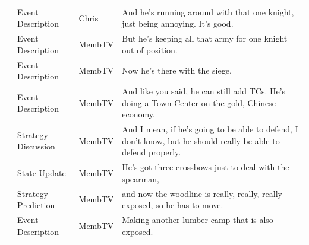 {\begin{longtable}{@{}>{\theAppRow}r|L{2.3cm}L{1.0cm}U{11.55cm}@{}}
    & Event Description     & Chris        & And he's running around with that one knight, just being annoying. It's good.                                                                                                                                                                                    \\
    & Event Description     & MembTV       & But he's keeping all that army for one knight out of position.                                                                                                                                                                                                   \\
    & Event Description     & MembTV       & Now he's there with the siege.                                                                                                                                                                                                                                   \\
    & Event Description     & MembTV       & And like you said, he can still add TCs. He's doing a Town Center on the gold, Chinese economy.                                                                                                                                                                  \\
    & Strategy Discussion   & MembTV       & And I mean, if he's going to be able to defend, I don't know, but he should really be able to defend properly.                                                                                                                                                   \\
    & State Update          & MembTV       & He's got three crossbows just to deal with the spearman,                                                                                                                                                                                                         \\
    & Strategy Prediction   & MembTV       & and now the woodline is really, really, really exposed, so he has to move.                                                                                                                                                                                       \\
    & Event Description     & MembTV       & Making another lumber camp that is also exposed.                                                                                                                                                                                                                 \\

\end{longtable}}

